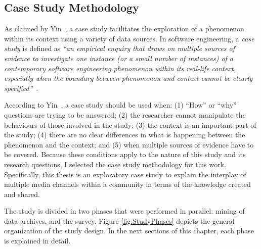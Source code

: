 \documentclass{sig-alternate-05-2015}
\begin{document}


\subsection{Case Study Methodology}

	As claimed by Yin~\cite{Yin2009,Yin2012}, a case study facilitates the exploration of a phenomenon within its context using a variety of data sources.
	In software engineering, a \textit{case study} is defined as  \textit{``an empirical enquiry that draws on multiple sources of evidence to investigate one instance (or a small number of instances) of a contemporary software engineering phenomenon within its real-life context, especially when the boundary between phenomenon and context cannot be clearly specified''}~\cite{Runeson2012}.

	According to Yin~\cite{Yin2012}, a case study should be used when: 
	(1) ``How'' or ``why'' questions are trying to be answered; 
	(2) the researcher cannot manipulate the behaviours of those involved in the study; 
	(3) the context is an important part of the study; 
	(4) there are no clear differences in what is happening between the phenomenon and the context; 
	and (5) when multiple sources of evidence have to be covered. 
	Because these conditions apply to the nature of this study and its research questions, I selected the case study methodology for this work. 
	Specifically, this thesis is an exploratory case study to explain the interplay of multiple media channels within a community in terms of the knowledge created and shared.

	The study is divided in two phases that were performed in parallel: mining of data archives, and the survey.
	Figure \ref{fig:StudyPhases} depicts the general organization of the study design.
	In the next sections of this chapter, each phase is explained in detail.
\end{document}
